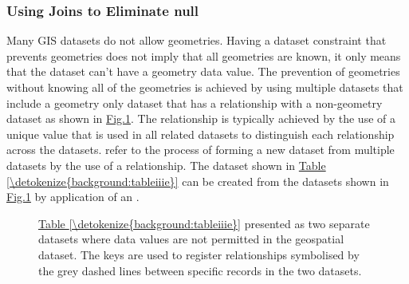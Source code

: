 \documentclass[a4paper,11pt,english]{sphinxmanual}
\begin{document}
\subsubsection{Using Joins to Eliminate null}
\label{\detokenize{background:using-joins-to-eliminate-null}}
Many GIS datasets do not allow  geometries.  Having a dataset constraint that prevents  geometries does not imply that all geometries are known, it only means that the dataset can’t have a  geometry data value.  The prevention of  geometries without knowing all of the geometries is achieved by using multiple datasets that include a geometry only dataset that has a relationship with a non-geometry dataset as shown in \hyperref[\detokenize{background:figurejoinedcrosses}]{Fig.\@ \ref{\detokenize{background:figurejoinedcrosses}}}.  The relationship is typically achieved by the use of a unique value  that is used in all related datasets to distinguish each relationship across the datasets.   refer to the process of forming a new dataset from multiple datasets by the use of a relationship.  The dataset shown in \hyperref[\detokenize{background:tableiiie}]{Table \ref{\detokenize{background:tableiiie}}} can be created from the datasets shown in \hyperref[\detokenize{background:figurejoinedcrosses}]{Fig.\@ \ref{\detokenize{background:figurejoinedcrosses}}} by application of an .

\begin{figure}[htbp]
\centering
\capstart

\noindent{}
\caption{\hyperref[\detokenize{background:tableiiie}]{Table \ref{\detokenize{background:tableiiie}}} presented as two separate datasets where   data values are not permitted in the geospatial dataset.  The  keys are used to register relationships symbolised by the grey dashed lines between specific records in the two datasets.}\label{\detokenize{background:id38}}\label{\detokenize{background:figurejoinedcrosses}}\end{figure}
\end{document}
